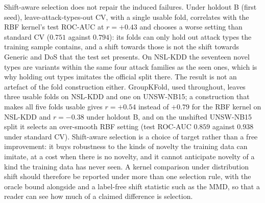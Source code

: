 \documentclass[preprint,11pt]{elsarticle}
\begin{document}
Shift-aware selection does not repair the induced failures. Under holdout B (first seed),
leave-attack-types-out CV, with a single usable fold, correlates with the RBF kernel's test ROC-AUC at $r=+0.43$ and chooses a worse
setting than standard CV ($0.751$ against $0.794$): its folds can only hold out attack types the training
sample contains, and a shift towards those is not the shift towards Generic and DoS that the test set
presents. On NSL-KDD the seventeen novel types are variants within the same four attack families as the
seen ones, which is why holding out types imitates the official split there. The result is not an
artefact of the fold construction either. GroupKFold, used throughout, leaves three usable folds on
NSL-KDD and one on UNSW-NB15; a construction that makes all five folds usable gives $r=+0.54$ instead of
$+0.79$ for the RBF kernel on NSL-KDD and $r=-0.38$ under holdout B, and on the unshifted UNSW-NB15 split
it selects an over-smooth RBF setting (test ROC-AUC $0.859$ against $0.938$ under standard CV).
Shift-aware selection is a choice of target rather than a free improvement: it buys robustness to the
kinds of novelty the training data can imitate, at a cost when there is no novelty, and it cannot
anticipate novelty of a kind the training data has never seen. A kernel comparison under distribution
shift should therefore be reported under more than one selection rule, with the oracle bound alongside
and a label-free shift statistic such as the MMD, so that a reader can see how much of a claimed
difference is selection.
\end{document}
